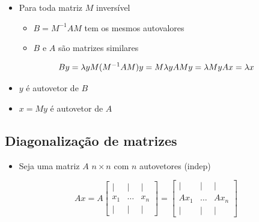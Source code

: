 \documentclass[
  letterpaper,
  DIV=11,
  numbers=noendperiod]{scrartcl}
\providecommand{\tightlist}{%
  \setlength{\itemsep}{0pt}\setlength{\parskip}{0pt}}\usepackage{longtable,booktabs,array}
\begin{document}
\begin{itemize}
\tightlist
\item
  Para toda matriz \(M\) inversível

  \begin{itemize}
  \tightlist
  \item
    \(B = M^{-1}AM\) tem os mesmos autovalores
  \item
    \(B\) e \(A\) são matrizes similares
  \end{itemize}
\end{itemize}

\begin{tcolorbox}[enhanced jigsaw, arc=.35mm, opacityback=0, bottomtitle=1mm, left=2mm, coltitle=black, rightrule=.15mm, colbacktitle=quarto-callout-note-color!10!white, breakable, opacitybacktitle=0.6, bottomrule=.15mm, title=\textcolor{quarto-callout-note-color}{\faInfo}\hspace{0.5em}{Note}, titlerule=0mm, colframe=quarto-callout-note-color-frame, toprule=.15mm, toptitle=1mm, leftrule=.75mm, colback=white]
\[ By = \lambda y \\ M(M^{-1}AM)y = M\lambda y \\ AMy = \lambda My \\ Ax = \lambda x\]
\end{tcolorbox}

\begin{itemize}
\tightlist
\item
  \(y\) é autovetor de \(B\)
\item
  \(x=My\) é autovetor de \(A\)
\end{itemize}

\hypertarget{diagonalizauxe7uxe3o-de-matrizes}{%
\subsection{Diagonalização de
matrizes}\label{diagonalizauxe7uxe3o-de-matrizes}}

\begin{itemize}
\tightlist
\item
  Seja uma matriz \(A\) \(n\times n\) com \(n\) autovetores (indep)
\end{itemize}

\[Ax = A\begin{bmatrix}\mid & \mid & \mid \\ x_1& \ldots& x_n \\ \mid & \mid & \mid\end{bmatrix} = \begin{bmatrix}\mid & \mid & \mid \\ Ax_1& \ldots& Ax_n \\ \mid & \mid & \mid\end{bmatrix}\]
\end{document}
